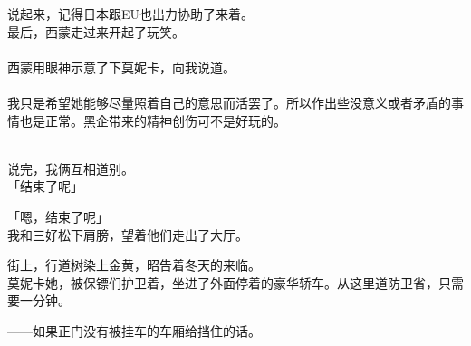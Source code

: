 说起来，记得日本跟EU也出力协助了来着。\\

最后，西蒙走过来开起了玩笑。\\

\\

西蒙用眼神示意了下莫妮卡，向我说道。\\

\\

我只是希望她能够尽量照着自己的意思而活罢了。所以作出些没意义或者矛盾的事情也是正常。黑企带来的精神创伤可不是好玩的。\\


\\

说完，我俩互相道别。\\

「结束了呢」

「嗯，结束了呢」\\

我和三好松下肩膀，望着他们走出了大厅。

街上，行道树染上金黄，昭告着冬天的来临。\\

莫妮卡她，被保镖们护卫着，坐进了外面停着的豪华轿车。从这里道防卫省，只需要一分钟。

——如果正门没有被挂车的车厢给挡住的话。\\
